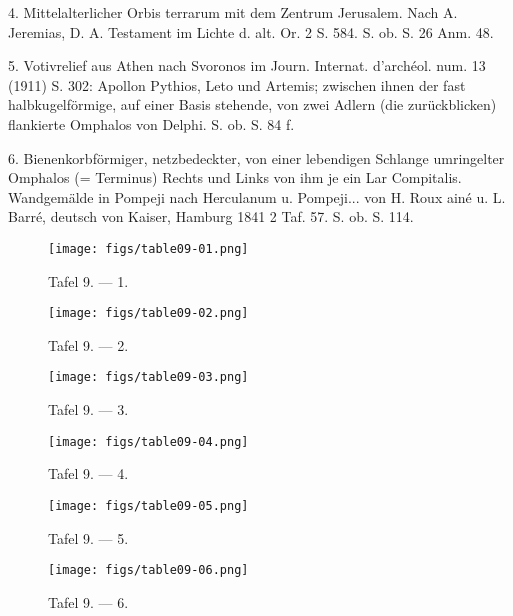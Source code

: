 \documentclass[a4paper, 11pt, oneside]{article}
\begin{document}
4. Mittelalterlicher Orbis terrarum mit dem Zentrum Jerusalem. Nach A. Jeremias, D. A. Testament im Lichte d. alt. Or. 2 S. 584. S. ob. S. 26 Anm. 48.

5. Votivrelief aus Athen nach Svoronos im Journ. Internat. d'archéol. num. 13 (1911) S. 302: Apollon Pythios, Leto und Artemis; zwischen ihnen der fast halbkugelförmige, auf einer Basis stehende, von zwei Adlern (die zurückblicken) flankierte Omphalos von Delphi. S. ob. S. 84 f.

6. Bienenkorbförmiger, netzbedeckter, von einer lebendigen Schlange umringelter Omphalos (= Terminus) Rechts und Links von ihm je ein Lar Compitalis. Wandgemälde in Pompeji nach Herculanum u. Pompeji... von H. Roux ainé u. L. Barré, deutsch von Kaiser, Hamburg 1841 2 Taf. 57. S. ob. S. 114.
\clearpage
\vspace*{\fill}
\begin{figure}[H]
\centering
\texttt{[image: figs/table09-01.png]}
\caption{Tafel 9. --- 1.}
\end{figure}
\vspace*{\fill}
\clearpage
\vspace*{\fill}
\begin{figure}[H]
\centering
\texttt{[image: figs/table09-02.png]}
\caption{Tafel 9. --- 2.}
\end{figure}
\vspace*{\fill}
\clearpage
\vspace*{\fill}
\begin{figure}[H]
\centering
\texttt{[image: figs/table09-03.png]}
\caption{Tafel 9. --- 3.}
\end{figure}
\vspace*{\fill}
\clearpage
\vspace*{\fill}
\begin{figure}[H]
\centering
\texttt{[image: figs/table09-04.png]}
\caption{Tafel 9. --- 4.}
\end{figure}
\vspace*{\fill}
\clearpage
\vspace*{\fill}
\begin{figure}[H]
\centering
\texttt{[image: figs/table09-05.png]}
\caption{Tafel 9. --- 5.}
\end{figure}
\vspace*{\fill}
\clearpage
\vspace*{\fill}
\begin{figure}[H]
\centering
\texttt{[image: figs/table09-06.png]}
\caption{Tafel 9. --- 6.}
\end{figure}
\vspace*{\fill}
\clearpage
\end{document}
